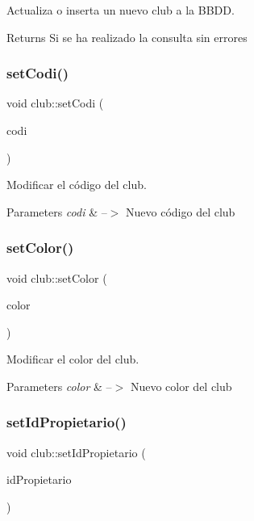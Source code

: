 Actualiza o inserta un nuevo club a la B\+B\+DD. 

\begin{DoxyReturn}{Returns}
Si se ha realizado la consulta sin errores 
\end{DoxyReturn}
\mbox{\label{classclub_af845385d60a9833c6c9ce50929a134a8}} 
\subsubsection{\texorpdfstring{set\+Codi()}{setCodi()}}
{\footnotesize\ttfamily void club\+::set\+Codi (\begin{DoxyParamCaption}\item[{Q\+String}]{codi }\end{DoxyParamCaption})}



Modificar el código del club. 


\begin{DoxyParams}{Parameters}
{\em codi} & --$>$ Nuevo código del club \\
\hline
\end{DoxyParams}
\mbox{\label{classclub_ac29fce99b2429c5645a85c595528fc9a}} 
\subsubsection{\texorpdfstring{set\+Color()}{setColor()}}
{\footnotesize\ttfamily void club\+::set\+Color (\begin{DoxyParamCaption}\item[{Q\+String}]{color }\end{DoxyParamCaption})}



Modificar el color del club. 


\begin{DoxyParams}{Parameters}
{\em color} & --$>$ Nuevo color del club \\
\hline
\end{DoxyParams}
\mbox{\label{classclub_ae1e13f2514221a45c7d566bbad4bd188}} 
\subsubsection{\texorpdfstring{set\+Id\+Propietario()}{setIdPropietario()}}
{\footnotesize\ttfamily void club\+::set\+Id\+Propietario (\begin{DoxyParamCaption}\item[{int}]{id\+Propietario }\end{DoxyParamCaption})}



